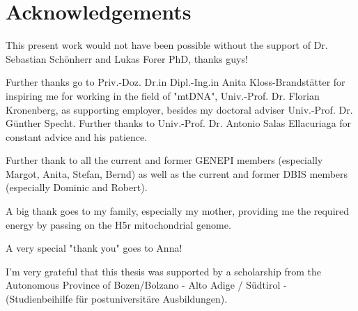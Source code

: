 \section*{Acknowledgements}


This present work would not have been possible without the support of Dr. Sebastian Sch\"onherr and Lukas Forer PhD, thanks guys! 

Further thanks go to Priv.-Doz. Dr.in Dipl.-Ing.in Anita Kloss-Brandst\"atter for inspiring me for working in the field of "mtDNA", Univ.-Prof. Dr. Florian Kronenberg, as supporting employer, besides my doctoral adviser Univ.-Prof. Dr. G\"unther Specht. Further thanks to Univ.-Prof. Dr. Antonio Salas Ellacuriaga for constant advice and his patience.

Further thank to all the current and former GENEPI members (especially Margot, Anita, Stefan, Bernd) as well as the current and former DBIS members (especially Dominic and Robert).

A big thank goes to my family, especially my mother, providing me the required energy by passing on the H5r mitochondrial genome. 

A very special "thank you" goes to Anna! 

I'm very grateful that this thesis was supported by a scholarship from the Autonomous Province of Bozen/Bolzano - Alto Adige / S\"udtirol - (Studienbeihilfe f\"ur postuniversit\"are Ausbildungen). 

 
%
\cleardoublepage
